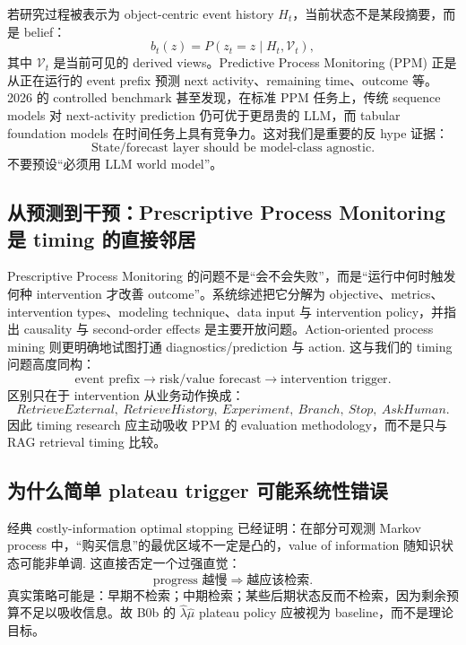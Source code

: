 \documentclass[11pt,a4paper]{ctexart}
\begin{document}
若研究过程被表示为 object-centric event history $H_t$，当前状态不是某段摘要，而是 belief：
\begin{equation}
 b_t(z)=P(z_t=z\mid H_t,\mathcal V_t),
\end{equation}
其中 $\mathcal V_t$ 是当前可见的 derived views。Predictive Process Monitoring (PPM) 正是从正在运行的 event prefix 预测 next activity、remaining time、outcome 等。2026 的 controlled benchmark 甚至发现，在标准 PPM 任务上，传统 sequence models 对 next-activity prediction 仍可优于更昂贵的 LLM，而 tabular foundation models 在时间任务上具有竞争力\cite{fertig2026ppm}。这对我们是重要的反 hype 证据：
\begin{equation}
\boxed{
\text{State/forecast layer should be model-class agnostic.}
}
\end{equation}
不要预设“必须用 LLM world model”。

\subsection{从预测到干预：Prescriptive Process Monitoring 是 timing 的直接邻居}

Prescriptive Process Monitoring 的问题不是“会不会失败”，而是“运行中何时触发何种 intervention 才改善 outcome”。系统综述把它分解为 objective、metrics、intervention types、modeling technique、data input 与 intervention policy，并指出 causality 与 second-order effects 是主要开放问题\cite{kubrak2022prescriptive}。Action-oriented process mining 则更明确地试图打通 diagnostics/prediction 与 action\cite{gronau2022action}. 这与我们的 timing 问题高度同构：
\begin{equation}
\text{event prefix}\to \text{risk/value forecast}\to \text{intervention trigger}.
\end{equation}
区别只在于 intervention 从业务动作换成：
\[
RetrieveExternal,\ RetrieveHistory,\ Experiment,\ Branch,\ Stop,\ AskHuman.
\]
因此 timing research 应主动吸收 PPM 的 evaluation methodology，而不是只与 RAG retrieval timing 比较。

\subsection{为什么简单 plateau trigger 可能系统性错误}

经典 costly-information optimal stopping 已经证明：在部分可观测 Markov process 中，“购买信息”的最优区域不一定是凸的，value of information 随知识状态可能非单调\cite{monahan1980}. 这直接否定一个过强直觉：
\[
\text{progress 越慢}\Rightarrow\text{越应该检索}.
\]
真实策略可能是：早期不检索；中期检索；某些后期状态反而不检索，因为剩余预算不足以吸收信息。故 B0b 的 $\hat\lambda\hat\mu$ plateau policy 应被视为 baseline，而不是理论目标。
\end{document}
